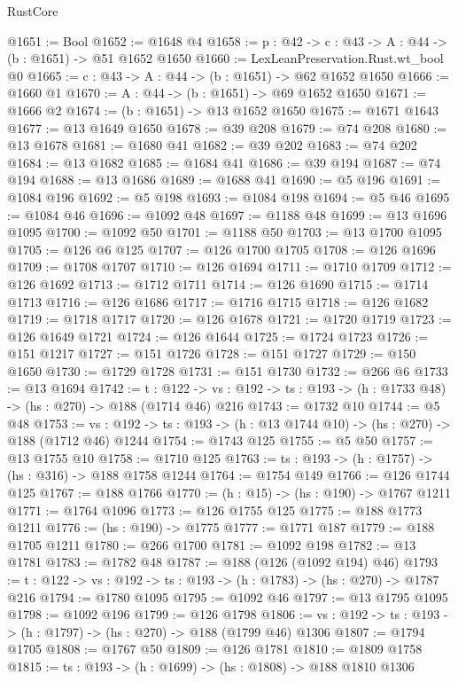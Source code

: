\begin{lexlean}{RustCore}
\begin{coremodule}
@1651 := Bool
@1652 := @1648 @4
@1658 := {p : @42} -> {c : @43} -> {A : @44} -> (b : @1651) -> @51 @1652 @1650
@1660 := LexLeanPreservation.Rust.wt_bool @0
@1665 := {c : @43} -> {A : @44} -> (b : @1651) -> @62 @1652 @1650
@1666 := @1660 @1
@1670 := {A : @44} -> (b : @1651) -> @69 @1652 @1650
@1671 := @1666 @2
@1674 := (b : @1651) -> @13 @1652 @1650
@1675 := @1671 @1643
@1677 := @13 @1649 @1650
@1678 := @39 @208
@1679 := @74 @208
@1680 := @13 @1678
@1681 := @1680 @41
@1682 := @39 @202
@1683 := @74 @202
@1684 := @13 @1682
@1685 := @1684 @41
@1686 := @39 @194
@1687 := @74 @194
@1688 := @13 @1686
@1689 := @1688 @41
@1690 := @5 @196
@1691 := @1084 @196
@1692 := @5 @198
@1693 := @1084 @198
@1694 := @5 @46
@1695 := @1084 @46
@1696 := @1092 @48
@1697 := @1188 @48
@1699 := @13 @1696 @1095
@1700 := @1092 @50
@1701 := @1188 @50
@1703 := @13 @1700 @1095
@1705 := @126 @6 @125
@1707 := @126 @1700 @1705
@1708 := @126 @1696
@1709 := @1708 @1707
@1710 := @126 @1694
@1711 := @1710 @1709
@1712 := @126 @1692
@1713 := @1712 @1711
@1714 := @126 @1690
@1715 := @1714 @1713
@1716 := @126 @1686
@1717 := @1716 @1715
@1718 := @126 @1682
@1719 := @1718 @1717
@1720 := @126 @1678
@1721 := @1720 @1719
@1723 := @126 @1649 @1721
@1724 := @126 @1644
@1725 := @1724 @1723
@1726 := @151 @1217
@1727 := @151 @1726
@1728 := @151 @1727
@1729 := @150 @1650
@1730 := @1729 @1728
@1731 := @151 @1730
@1732 := @266 @6
@1733 := @13 @1694
@1742 := {t : @122} ->
  {vs : @192} -> {ts : @193} -> (h : @1733 @48) -> (hs : @270) -> @188 (@1714 @46) @216
@1743 := @1732 @10
@1744 := @5 @48
@1753 := {vs : @192} -> {ts : @193} -> (h : @13 @1744 @10) -> (hs : @270) -> @188 (@1712 @46) @1244
@1754 := @1743 @125
@1755 := @5 @50
@1757 := @13 @1755 @10
@1758 := @1710 @125
@1763 := {ts : @193} -> (h : @1757) -> (hs : @316) -> @188 @1758 @1244
@1764 := @1754 @149
@1766 := @126 @1744 @125
@1767 := @188 @1766
@1770 := (h : @15) -> (hs : @190) -> @1767 @1211
@1771 := @1764 @1096
@1773 := @126 @1755 @125
@1775 := @188 @1773 @1211
@1776 := (hs : @190) -> @1775
@1777 := @1771 @187
@1779 := @188 @1705 @1211
@1780 := @266 @1700
@1781 := @1092 @198
@1782 := @13 @1781
@1783 := @1782 @48
@1787 := @188 (@126 (@1092 @194) @46)
@1793 := {t : @122} -> {vs : @192} -> {ts : @193} -> (h : @1783) -> (hs : @270) -> @1787 @216
@1794 := @1780 @1095
@1795 := @1092 @46
@1797 := @13 @1795 @1095
@1798 := @1092 @196
@1799 := @126 @1798
@1806 := {vs : @192} -> {ts : @193} -> (h : @1797) -> (hs : @270) -> @188 (@1799 @46) @1306
@1807 := @1794 @1705
@1808 := @1767 @50
@1809 := @126 @1781
@1810 := @1809 @1758
@1815 := {ts : @193} -> (h : @1699) -> (hs : @1808) -> @188 @1810 @1306

\end{coremodule}
\end{lexlean}
